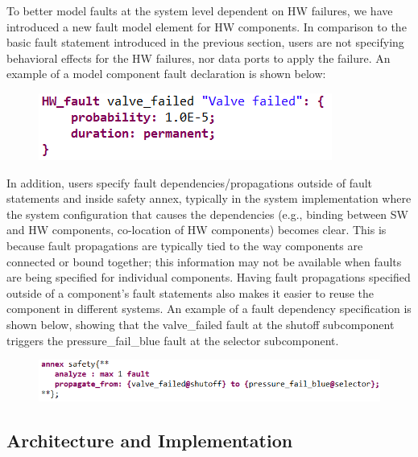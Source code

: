 To better model faults at the system level dependent on HW failures, we have introduced a new fault model element for HW components. In comparison to the basic fault statement introduced in the previous section, users are not specifying behavioral effects for the HW failures, nor data ports to apply the failure. An example of a model component fault declaration is shown below:
\begin{figure}[h!]
		\vspace{-0.2in}
	\begin{center}
		\includegraphics[width=.5\textwidth]{images/hw_fault.png}
	\end{center}
	\vspace{-0.4in}
\end{figure}

In addition, users specify fault dependencies/propagations outside of fault statements and inside safety annex, typically in the system implementation where the system configuration that causes the dependencies (e.g., binding between SW and HW components, co-location of HW components) becomes clear. This is because fault propagations are typically tied to the way components are connected or bound together; this information may not be available when faults are being specified for individual components. Having fault propagations specified outside of a component’s fault statements also makes it easier to reuse the component in different systems. An example of a fault dependency specification is shown below, showing that the valve{\_}failed fault at the shutoff subcomponent triggers the pressure{\_}fail{\_}blue fault at the selector subcomponent.
\begin{figure}[h!]
	\vspace{-0.2in}
	\begin{center}
		\includegraphics[width=.9\textwidth]{images/fault_propagation.png}
	\end{center}
	\vspace{-0.4in}
\end{figure}

\subsection{Architecture and Implementation}

